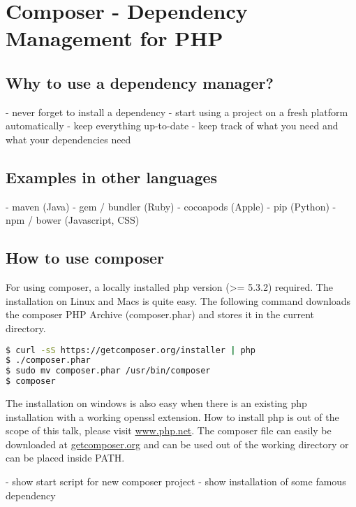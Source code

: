 \section{Composer - Dependency Management for PHP}

\subsection{Why to use a dependency manager?}
- never forget to install a dependency
- start using a project on a fresh platform automatically
- keep everything up-to-date
- keep track of what you need and what your dependencies need


\subsection{Examples in other languages}
- maven (Java)
- gem / bundler (Ruby)
- cocoapods (Apple)
- pip (Python)
- npm / bower (Javascript, CSS)

\subsection{How to use composer}

For using composer, a locally installed php version (>= 5.3.2) required.
The installation on Linux and Macs is quite easy. The following command downloads the composer PHP Archive (composer.phar) and stores it in the current directory. 
\begin{lstlisting}[language=bash]
$ curl -sS https://getcomposer.org/installer | php
$ ./composer.phar
$ sudo mv composer.phar /usr/bin/composer
$ composer
\end{lstlisting}

The installation on windows is also easy when there is an existing php installation with a working openssl extension. How to install php is out of the scope of this talk, please visit \url{www.php.net}.
The composer file can easily be downloaded at \url{getcomposer.org} and can be used out of the working directory or can be placed inside PATH. 



- show start script for new composer project
- show installation of some famous dependency
